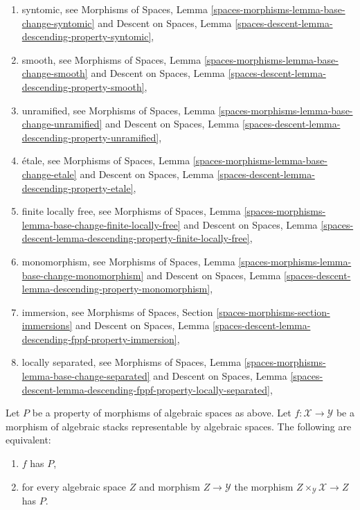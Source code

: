 \begin{enumerate}
\item syntomic, see
Morphisms of Spaces,
Lemma \ref{spaces-morphisms-lemma-base-change-syntomic}
and
Descent on Spaces,
Lemma \ref{spaces-descent-lemma-descending-property-syntomic},
\item smooth, see
Morphisms of Spaces,
Lemma \ref{spaces-morphisms-lemma-base-change-smooth}
and
Descent on Spaces,
Lemma \ref{spaces-descent-lemma-descending-property-smooth},
\item unramified, see
Morphisms of Spaces,
Lemma \ref{spaces-morphisms-lemma-base-change-unramified}
and
Descent on Spaces,
Lemma \ref{spaces-descent-lemma-descending-property-unramified},
\item \'etale, see
Morphisms of Spaces,
Lemma \ref{spaces-morphisms-lemma-base-change-etale}
and
Descent on Spaces,
Lemma \ref{spaces-descent-lemma-descending-property-etale},
\item finite locally free, see
Morphisms of Spaces,
Lemma \ref{spaces-morphisms-lemma-base-change-finite-locally-free}
and
Descent on Spaces,
Lemma \ref{spaces-descent-lemma-descending-property-finite-locally-free},
\item monomorphism, see
Morphisms of Spaces,
Lemma \ref{spaces-morphisms-lemma-base-change-monomorphism}
and
Descent on Spaces,
Lemma \ref{spaces-descent-lemma-descending-property-monomorphism},
\item immersion, see
Morphisms of Spaces, Section \ref{spaces-morphisms-section-immersions}
and
Descent on Spaces,
Lemma \ref{spaces-descent-lemma-descending-fppf-property-immersion},
\item locally separated, see
Morphisms of Spaces,
Lemma \ref{spaces-morphisms-lemma-base-change-separated}
and
Descent on Spaces,
Lemma \ref{spaces-descent-lemma-descending-fppf-property-locally-separated},
\end{enumerate}

\begin{lemma}
\label{lemma-property-spaces-too}
Let $P$ be a property of morphisms of algebraic spaces as above.
Let $f : \mathcal{X} \to \mathcal{Y}$ be a morphism of algebraic stacks
representable by algebraic spaces. The following are equivalent:
\begin{enumerate}
\item $f$ has $P$,
\item for every algebraic space $Z$ and morphism $Z \to \mathcal{Y}$
the morphism $Z \times_\mathcal{Y} \mathcal{X} \to Z$ has $P$.
\end{enumerate}
\end{lemma}

